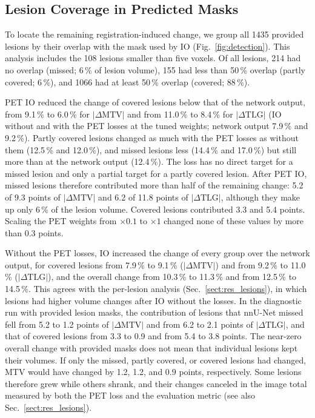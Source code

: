 

\subsection{Lesion Coverage in Predicted Masks}
\label{sect:res_detection}

To locate the remaining registration-induced change, we group all 1435 provided lesions by their overlap with the mask used by IO (Fig.~\ref{fig:detection}).
This analysis includes the 108 lesions smaller than five voxels.
Of all lesions, 214 had no overlap (missed; 6\,\% of lesion volume), 155 had less than 50\,\% overlap (partly covered; 6\,\%), and 1066 had at least 50\,\% overlap (covered; 88\,\%).

PET IO reduced the change of covered lesions below that of the network output, from 9.1\,\% to 6.0\,\% for $|\Delta\mathrm{MTV}|$ and from 11.0\,\% to 8.4\,\% for $|\Delta\mathrm{TLG}|$ (IO without and with the PET losses at the tuned weights; network output 7.9\,\% and 9.2\,\%).
Partly covered lesions changed as much with the PET losses as without them (12.5\,\% and 12.0\,\%), and missed lesions less (14.4\,\% and 17.0\,\%) but still more than at the network output (12.4\,\%).
The loss has no direct target for a missed lesion and only a partial target for a partly covered lesion.
After PET IO, missed lesions therefore contributed more than half of the remaining change: 5.2 of 9.3 points of $|\Delta\mathrm{MTV}|$ and 6.2 of 11.8 points of $|\Delta\mathrm{TLG}|$, although they make up only 6\,\% of the lesion volume.
Covered lesions contributed 3.3 and 5.4 points.
Scaling the PET weights from $\times0.1$ to $\times1$ changed none of these values by more than 0.3 points.

Without the PET losses, IO increased the change of every group over the network output, for covered lesions from 7.9\,\% to 9.1\,\% ($|\Delta\mathrm{MTV}|$) and from 9.2\,\% to 11.0\,\% ($|\Delta\mathrm{TLG}|$), and the overall change from 10.3\,\% to 11.3\,\% and from 12.5\,\% to 14.5\,\%.
This agrees with the per-lesion analysis (Sec.~\ref{sect:res_lesions}), in which lesions had higher volume changes after IO without the losses.
In the diagnostic run with provided lesion masks, the contribution of lesions that nnU-Net missed fell from 5.2 to 1.2 points of $|\Delta\mathrm{MTV}|$ and from 6.2 to 2.1 points of $|\Delta\mathrm{TLG}|$, and that of covered lesions from 3.3 to 0.9 and from 5.4 to 3.8 points.
The near-zero overall change with provided masks does not mean that individual lesions kept their volumes.
If only the missed, partly covered, or covered lesions had changed, MTV would have changed by 1.2, 1.2, and 0.9 points, respectively.
Some lesions therefore grew while others shrank, and their changes canceled in the image total measured by both the PET loss and the evaluation metric (see also Sec.~\ref{sect:res_lesions}).

